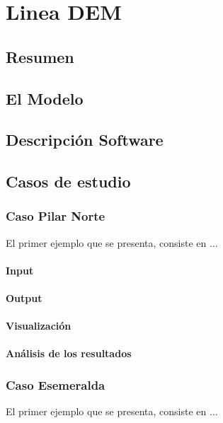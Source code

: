 
\chapter{Linea DEM }

\section{Resumen}

\section{El Modelo}

\section{Descripci\'on Software}


\section{Casos de estudio}

\subsection{Caso Pilar Norte}


El primer ejemplo que se presenta, consiste en ...


\subsubsection{Input}

\subsubsection{Output}

\subsubsection{Visualizaci\'on}

\subsubsection{An\'alisis de los resultados}

\subsection{Caso Esemeralda}
%  
El primer ejemplo que se presenta, consiste en ...


